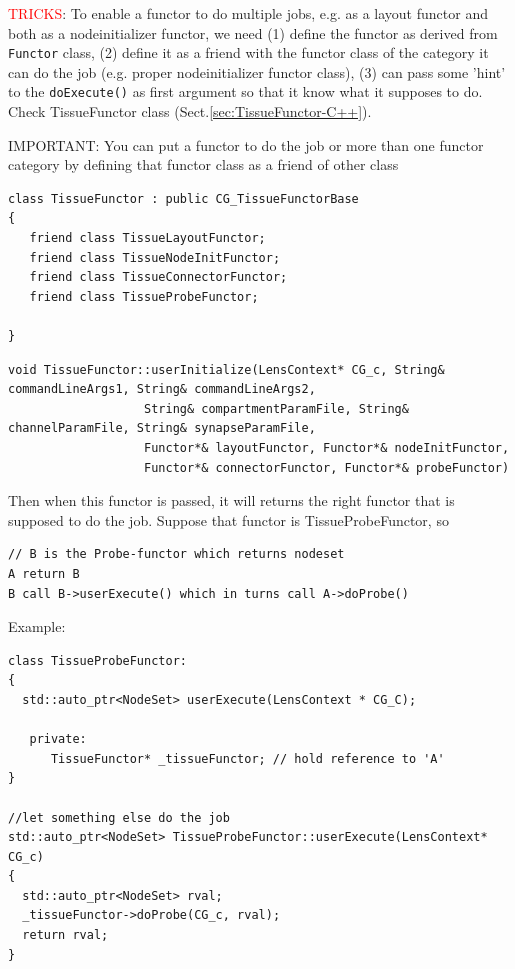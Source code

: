 \textcolor{red}{TRICKS}: To enable a functor to do multiple jobs, e.g. as a
layout functor and both as a nodeinitializer functor, we need (1) define the
functor as derived from \verb!Functor! class, (2) define it as a friend with the
functor class of the category it can do the job (e.g. proper nodeinitializer
functor class), (3) can pass some 'hint' to the \verb!doExecute()! as first
argument so that it know what it supposes to do. Check TissueFunctor class
(Sect.\ref{sec:TissueFunctor-C++}).


IMPORTANT: You can put a functor to do the job or more than one functor category
by defining that functor class as a friend of other class
\begin{verbatim}
class TissueFunctor : public CG_TissueFunctorBase
{
   friend class TissueLayoutFunctor;
   friend class TissueNodeInitFunctor;
   friend class TissueConnectorFunctor;
   friend class TissueProbeFunctor;

}
\end{verbatim}

\begin{verbatim}
void TissueFunctor::userInitialize(LensContext* CG_c, String& commandLineArgs1, String& commandLineArgs2, 
				   String& compartmentParamFile, String& channelParamFile, String& synapseParamFile,
				   Functor*& layoutFunctor, Functor*& nodeInitFunctor, 
				   Functor*& connectorFunctor, Functor*& probeFunctor)

\end{verbatim}

Then when this functor is passed, it will returns the right functor  that is
supposed to do the job. Suppose that functor is TissueProbeFunctor, so 
\begin{verbatim}
// B is the Probe-functor which returns nodeset
A return B
B call B->userExecute() which in turns call A->doProbe()
\end{verbatim}

Example: 
\begin{verbatim}
class TissueProbeFunctor: 
{
  std::auto_ptr<NodeSet> userExecute(LensContext * CG_C);
 
   private:
      TissueFunctor* _tissueFunctor; // hold reference to 'A'
}

//let something else do the job
std::auto_ptr<NodeSet> TissueProbeFunctor::userExecute(LensContext* CG_c) 
{
  std::auto_ptr<NodeSet> rval;
  _tissueFunctor->doProbe(CG_c, rval);
  return rval;
}
\end{verbatim}


